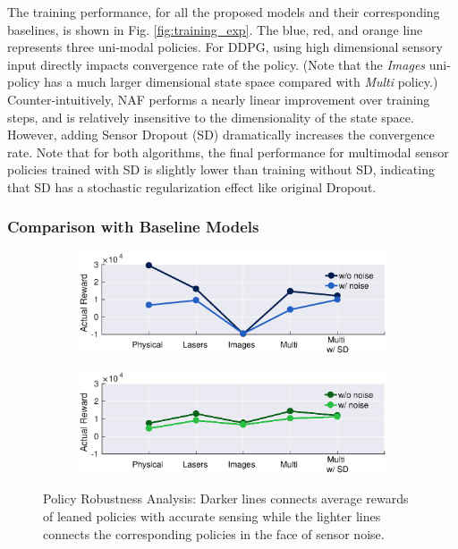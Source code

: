 \documentclass[../thesis.tex]{subfiles}
\begin{document}
The training performance, for all the proposed models and their corresponding baselines, is shown in Fig. \ref{fig:training_exp}. The blue, red, and orange line represents three uni-modal policies.
For DDPG, using high dimensional sensory input directly impacts convergence rate of the policy. (Note that the \textit{Images} uni-policy has a much larger dimensional state space compared with \textit{Multi} policy.)
Counter-intuitively, NAF performs a nearly linear improvement over training steps, and is relatively insensitive to the dimensionality of the state space. However, adding Sensor Dropout (SD) dramatically increases the convergence rate.
Note that for both algorithms, the final performance for multimodal sensor policies trained with SD is slightly lower than training without SD, indicating that SD has a stochastic regularization effect like original Dropout.
 
 
\subsubsection{Comparison with Baseline Models}
 
\begin{figure}[t]
	\centering
	\begin{subfigure}[b]{0.48\linewidth}
    	\includegraphics[width=\columnwidth,trim= 45 180 45 10, clip=true]{./MultimodalDRL/fig/actual_robust_naf}
    	\label{fig:actual_robust_naf}
	\end{subfigure}
	\begin{subfigure}[b]{0.48\linewidth}
    	\includegraphics[width=\columnwidth,trim= 45 180 45 10, clip=true]{./MultimodalDRL/fig/actual_robust_ddpg}
    	\label{fig:actual_robust_ddpg}
	\end{subfigure}
	\caption{Policy Robustness Analysis: Darker lines connects average rewards of leaned policies with accurate sensing while the lighter lines connects the corresponding policies in the face of sensor noise.}
	\label{fig:actual_robust}
\end{figure}
 
\end{document}
